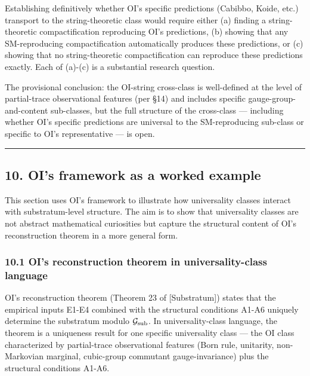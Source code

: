 \documentclass[
]{article}
\begin{document}
Establishing definitively whether OI's specific predictions (Cabibbo,
Koide, etc.) transport to the string-theoretic class would require
either (a) finding a string-theoretic compactification reproducing OI's
predictions, (b) showing that any SM-reproducing compactification
automatically produces these predictions, or (c) showing that no
string-theoretic compactification can reproduce these predictions
exactly. Each of (a)-(c) is a substantial research question.

The provisional conclusion: the OI-string cross-class is well-defined at
the level of partial-trace observational features (per §14) and includes
specific gauge-group-and-content sub-classes, but the full structure of
the cross-class --- including whether OI's specific predictions are
universal to the SM-reproducing sub-class or specific to OI's
representative --- is open.

\begin{center}\rule{0.5\linewidth}{0.5pt}\end{center}

\hypertarget{ois-framework-as-a-worked-example}{%
\subsection{10. OI's framework as a worked
example}\label{ois-framework-as-a-worked-example}}

This section uses OI's framework to illustrate how universality classes
interact with substratum-level structure. The aim is to show that
universality classes are not abstract mathematical curiosities but
capture the structural content of OI's reconstruction theorem in a more
general form.

\hypertarget{ois-reconstruction-theorem-in-universality-class-language}{%
\subsubsection{10.1 OI's reconstruction theorem in universality-class
language}\label{ois-reconstruction-theorem-in-universality-class-language}}

OI's reconstruction theorem (Theorem 23 of {[}Substratum{]}) states that
the empirical inputs E1-E4 combined with the structural conditions A1-A6
uniquely determine the substratum modulo \(\mathcal{G}_{\rm sub}\). In
universality-class language, the theorem is a uniqueness result for one
specific universality class --- the OI class characterized by
partial-trace observational features (Born rule, unitarity,
non-Markovian marginal, cubic-group commutant gauge-invariance) plus the
structural conditions A1-A6.
\end{document}
